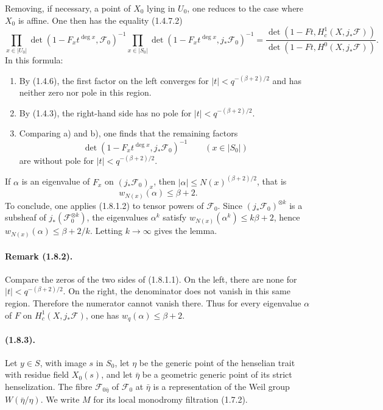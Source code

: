 \documentclass[11pt]{article}
\theoremstyle{remark}
\begin{document}
Removing, if necessary, a point of $X_0$ lying in $U_0$, one reduces to the case where $X_0$ is affine. One then has the equality (1.4.7.2)
\begin{equation}\tag{1.8.1.1}
\prod_{x\in |U_0|}\det(1-F_x t^{\deg x},\mathcal F_0)^{-1}
\prod_{x\in |S_0|}\det(1-F_x t^{\deg x},j_{*}\mathcal F_0)^{-1}
=
\frac{\det(1-Ft,H^1_c(X,j_{*}\mathcal F))}
{\det(1-Ft,H^0(X,j_{*}\mathcal F))}.
\end{equation}
In this formula:
\begin{enumerate}[label=\alph*)]
\item By (1.4.6), the first factor on the left converges for $|t|<q^{-(\beta+2)/2}$ and has neither zero nor pole in this region.
\item By (1.4.3), the right-hand side has no pole for $|t|<q^{-(\beta+2)/2}$.
\item Comparing a) and b), one finds that the remaining factors
\[
\det(1-F_x t^{\deg x},j_{*}\mathcal F_0)^{-1}\qquad (x\in |S_0|)
\]
are without pole for $|t|<q^{-(\beta+2)/2}$.
\end{enumerate}
If $\alpha$ is an eigenvalue of $F_x$ on $(j_{*}\mathcal F_0)_x$, then $|\alpha|\le N(x)^{(\beta+2)/2}$, that is
\begin{equation}\tag{1.8.1.2}
w_{N(x)}(\alpha)\le \beta+2.
\end{equation}
To conclude, one applies (1.8.1.2) to tensor powers of $\mathcal F_0$. Since $(j_{*}\mathcal F_0)^{\otimes k}$ is a subsheaf of $j_{*}(\mathcal F_0^{\otimes k})$, the eigenvalues $\alpha^k$ satisfy $w_{N(x)}(\alpha^k)\le k\beta+2$, hence $w_{N(x)}(\alpha)\le \beta+2/k$. Letting $k\to\infty$ gives the lemma.

\paragraph{Remark (1.8.2).}
Compare the zeros of the two sides of (1.8.1.1). On the left, there are none for $|t|<q^{-(\beta+2)/2}$. On the right, the denominator does not vanish in this same region. Therefore the numerator cannot vanish there. Thus for every eigenvalue $\alpha$ of $F$ on $H^1_c(X,j_{*}\mathcal F)$, one has $w_q(\alpha)\le \beta+2$.

\paragraph{(1.8.3).}
Let $y\in S$, with image $s$ in $S_0$, let $\eta$ be the generic point of the henselian trait with residue field $X_0(s)$, and let $\bar\eta$ be a geometric generic point of its strict henselization. The fibre $\mathcal F_{0\bar\eta}$ of $\mathcal F_0$ at $\bar\eta$ is a representation of the Weil group $W(\bar\eta/\eta)$. We write $M$ for its local monodromy filtration (1.7.2).
\end{document}
